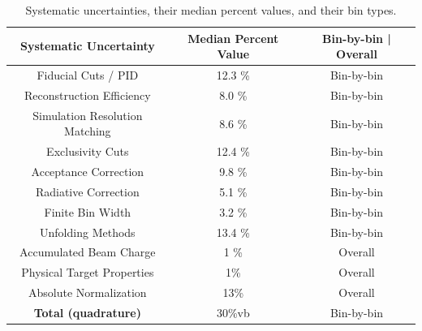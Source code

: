     \begin{table}[ht]
        \centering
        \begin{tabular}{|c|c|c|}
        \hline
        Systematic Uncertainty & Median Percent Value & Bin-by-bin | Overall \\ 
        \hline
            Fiducial Cuts / PID              & 12.3 \%    & Bin-by-bin   \\ 
            Reconstruction Efficiency       & 8.0 \%       & Bin-by-bin   \\ 
            Simulation Resolution Matching    & 8.6 \%       & Bin-by-bin   \\ 
            Exclusivity Cuts            & 12.4 \%      & Bin-by-bin   \\ 
            Acceptance Correction       & 9.8 \%       & Bin-by-bin   \\ 
            Radiative Correction        & 5.1 \%       & Bin-by-bin   \\ 
            Finite Bin Width            & 3.2 \%       & Bin-by-bin   \\
            Unfolding Methods            & 13.4 \%       & Bin-by-bin   \\ 
            Accumulated Beam Charge     & 1 \%        & Overall      \\ 
            Physical Target Properties  & 1\%    & Overall      \\
            Absolute Normalization      & 13\%       & Overall      \\ 
            \hline
            \textbf{Total (quadrature)}          & 30\%vb        & Bin-by-bin      \\ 
            

        \hline
        \end{tabular}
        \caption{Systematic uncertainties, their median percent values, and their bin types.}
        \label{table:systematic_uncertainties}
    \end{table}

